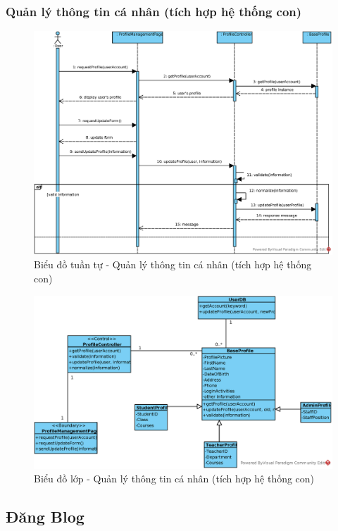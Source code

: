 \documentclass[./../main.tex]{subfiles}
\begin{document}
\subsubsection{Quản lý thông tin cá nhân (tích hợp hệ thống con)}
\begin{figure}[H]
    \centering
    \includegraphics[width=\linewidth]{./images/UseCaseDesignDiagram/ucr_ss_update_profile.eps}
    \caption{Biểu đồ tuần tự - Quản lý thông tin cá nhân (tích hợp hệ thống con)}
\end{figure}
\begin{figure}[H]
    \centering
    \includegraphics[width=\linewidth]{./images/UseCaseDesignDiagram/ucd_per_profile.eps}
    \caption{Biểu đồ lớp - Quản lý thông tin cá nhân (tích hợp hệ thống con)}
\end{figure}

\subsection{Đăng Blog}
\end{document}
